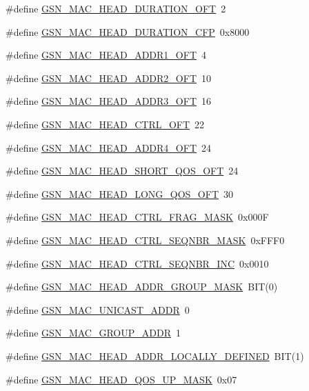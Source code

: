 \begin{DoxyCompactItemize}
\item 
\#define \hyperlink{a00523_a9283959c1983273aee5c97cd8fb4d5ab}{GSN\_\-MAC\_\-HEAD\_\-DURATION\_\-OFT}~2
\item 
\#define \hyperlink{a00523_afbd7ba83614e150e4e06a75e778e890a}{GSN\_\-MAC\_\-HEAD\_\-DURATION\_\-CFP}~0x8000
\item 
\#define \hyperlink{a00523_a988a265a567b415343692df942c3ab9a}{GSN\_\-MAC\_\-HEAD\_\-ADDR1\_\-OFT}~4
\item 
\#define \hyperlink{a00523_acb11c574787c9741968275884b9b3981}{GSN\_\-MAC\_\-HEAD\_\-ADDR2\_\-OFT}~10
\item 
\#define \hyperlink{a00523_a44bd2ee1b158e01db8d4542f0183496d}{GSN\_\-MAC\_\-HEAD\_\-ADDR3\_\-OFT}~16
\item 
\#define \hyperlink{a00523_a2f09582b7d49c89b15b387d416908ba3}{GSN\_\-MAC\_\-HEAD\_\-CTRL\_\-OFT}~22
\item 
\#define \hyperlink{a00523_a8f6bef923f5f6f9a1418430254787088}{GSN\_\-MAC\_\-HEAD\_\-ADDR4\_\-OFT}~24
\item 
\#define \hyperlink{a00523_af5a16fe59ad1e18bcd246b1fc6f9ed53}{GSN\_\-MAC\_\-HEAD\_\-SHORT\_\-QOS\_\-OFT}~24
\item 
\#define \hyperlink{a00523_a5f0e7eddb2d618ddeb6cb1427232ac34}{GSN\_\-MAC\_\-HEAD\_\-LONG\_\-QOS\_\-OFT}~30
\item 
\#define \hyperlink{a00523_a467fb66b5671f82dd19a6de597e66a18}{GSN\_\-MAC\_\-HEAD\_\-CTRL\_\-FRAG\_\-MASK}~0x000F
\item 
\#define \hyperlink{a00523_aa1da0a807cc6c80b8bd5daa3672bb4a6}{GSN\_\-MAC\_\-HEAD\_\-CTRL\_\-SEQNBR\_\-MASK}~0xFFF0
\item 
\#define \hyperlink{a00523_a9dd8c1ad1f5d0aa3bf3308ad9259a3e1}{GSN\_\-MAC\_\-HEAD\_\-CTRL\_\-SEQNBR\_\-INC}~0x0010
\item 
\#define \hyperlink{a00523_ac88624583249395e2cd6094d14479994}{GSN\_\-MAC\_\-HEAD\_\-ADDR\_\-GROUP\_\-MASK}~BIT(0)
\item 
\#define \hyperlink{a00523_aa7e63698a5e5d0013d510c5a051a1e91}{GSN\_\-MAC\_\-UNICAST\_\-ADDR}~0
\item 
\#define \hyperlink{a00523_a3db408b3669662589a6d7181d721512a}{GSN\_\-MAC\_\-GROUP\_\-ADDR}~1
\item 
\#define \hyperlink{a00523_a3252c62f5fdc0b5c52408c75ffc1da23}{GSN\_\-MAC\_\-HEAD\_\-ADDR\_\-LOCALLY\_\-DEFINED}~BIT(1)
\item 
\#define \hyperlink{a00523_a7c16158025b53bfe87f59c9b386bf2d8}{GSN\_\-MAC\_\-HEAD\_\-QOS\_\-UP\_\-MASK}~0x07
\item 

\end{DoxyCompactItemize}
